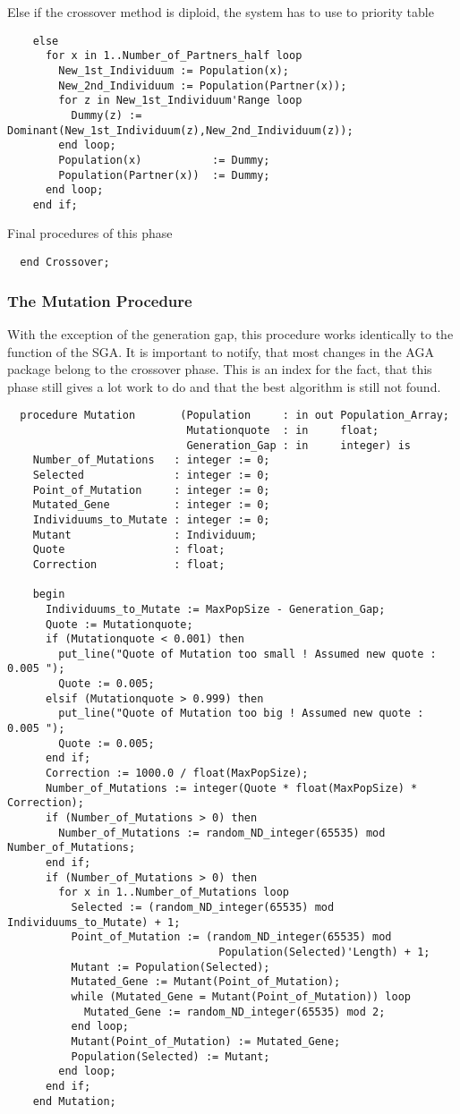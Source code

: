 Else if the crossover method is diploid, the system has to use to priority table
\begin{verbatim}
    else
      for x in 1..Number_of_Partners_half loop
        New_1st_Individuum := Population(x);
        New_2nd_Individuum := Population(Partner(x));
        for z in New_1st_Individuum'Range loop
          Dummy(z) := Dominant(New_1st_Individuum(z),New_2nd_Individuum(z));
        end loop;
        Population(x)           := Dummy;
        Population(Partner(x))  := Dummy;
      end loop;
    end if;
\end{verbatim}
Final procedures of this phase
\begin{verbatim}
  end Crossover;
\end{verbatim}
\subsubsection{The Mutation Procedure}
With the exception of the generation gap, this procedure works identically to
the function of the SGA. It is important to notify, that most changes in the AGA
package belong to the crossover phase. This is an index for the fact, that this
phase still gives a lot work to do and that the best algorithm is still not found.
\begin{verbatim}
  procedure Mutation       (Population     : in out Population_Array;
                            Mutationquote  : in     float;
                            Generation_Gap : in     integer) is
    Number_of_Mutations   : integer := 0;
    Selected              : integer := 0;
    Point_of_Mutation     : integer := 0;
    Mutated_Gene          : integer := 0;
    Individuums_to_Mutate : integer := 0;
    Mutant                : Individuum;
    Quote                 : float;
    Correction            : float;

    begin
      Individuums_to_Mutate := MaxPopSize - Generation_Gap;
      Quote := Mutationquote;
      if (Mutationquote < 0.001) then
        put_line("Quote of Mutation too small ! Assumed new quote : 0.005 ");
        Quote := 0.005;
      elsif (Mutationquote > 0.999) then
        put_line("Quote of Mutation too big ! Assumed new quote : 0.005 ");
        Quote := 0.005;
      end if;
      Correction := 1000.0 / float(MaxPopSize);
      Number_of_Mutations := integer(Quote * float(MaxPopSize) * Correction);
      if (Number_of_Mutations > 0) then
        Number_of_Mutations := random_ND_integer(65535) mod Number_of_Mutations;
      end if;
      if (Number_of_Mutations > 0) then
        for x in 1..Number_of_Mutations loop
          Selected := (random_ND_integer(65535) mod Individuums_to_Mutate) + 1;
          Point_of_Mutation := (random_ND_integer(65535) mod
                                 Population(Selected)'Length) + 1;
          Mutant := Population(Selected);
          Mutated_Gene := Mutant(Point_of_Mutation);
          while (Mutated_Gene = Mutant(Point_of_Mutation)) loop
            Mutated_Gene := random_ND_integer(65535) mod 2;
          end loop;
          Mutant(Point_of_Mutation) := Mutated_Gene;
          Population(Selected) := Mutant;
        end loop;
      end if;
    end Mutation;
\end{verbatim}
